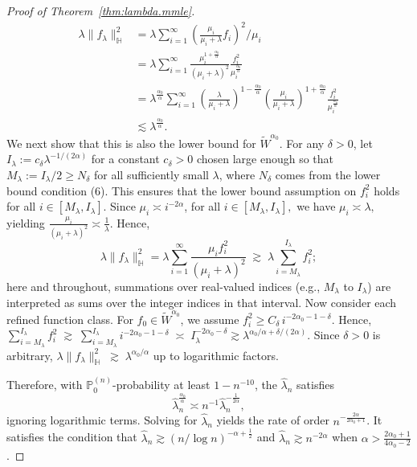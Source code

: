 \documentclass[12pt]{article}
\newcommand{\PP}{\mathbb{P}}
\newcommand{\bbH}{\mathbb{H}}
\theoremstyle{plain}
\theoremstyle{nonitalicremark}
\begin{document}
\begin{appendices}
\begin{proof}[Proof of Theorem~\ref{thm:lambda.mmle}]
\begin{align}
\lambda\|f_\lambda\|_\bbH^2&=\lambda\sum_{i=1}^{\infty} \left(\frac{\mu_i}{\mu_i+\lambda} f_i\right)^2 \bigg /\mu_i\\
&=\lambda\sum_{i=1}^{\infty} \frac{\mu_i^{1+\frac{\alpha_0}{\alpha}}}{(\mu_i+\lambda)^2}\frac{f_i^2}{\mu_i^{\frac{\alpha_0}{\alpha}}}\\
&=\lambda^{\frac{\alpha_0}{\alpha}}\sum_{i=1}^{\infty} \left(\frac{\lambda}{\mu_i+\lambda}\right)^{1-\frac{\alpha_0}{\alpha}}\left(\frac{\mu_i}{\mu_i+\lambda}\right)^{1+\frac{\alpha_0}{\alpha}}\frac{f_i^2}{\mu_i^{\frac{\alpha_0}{\alpha}}}\\
&\lesssim \lambda^{\frac{\alpha_0}{\alpha}}.
\end{align}
We next show that this is also the lower bound for $\widetilde{W}^{\alpha_0}$. For any $\delta > 0$, let $I_\lambda := c_\delta \lambda^{-1/(2\alpha)}$ for a constant $c_\delta > 0$ chosen large enough so that $M_\lambda := I_\lambda / 2 \ge N_\delta$ for all sufficiently small $\lambda$, where $N_{\delta}$ comes from the lower bound condition (6). This ensures that the lower bound assumption on $f_i^2$ holds for all $i \in [M_\lambda, I_\lambda]$.
Since $\mu_i \asymp i^{-2\alpha}$, for all $i \in [M_{\lambda}, I_{\lambda}],$  we have $\mu_i \asymp \lambda,$ yielding $  \frac{\mu_i}{(\mu_i + \lambda)^2}  \asymp \frac{1}{\lambda}.$
Hence,
\[
\lambda\|f_\lambda\|_\bbH^2 = \lambda \sum_{i=1}^\infty \frac{\mu_i f_i^2}{(\mu_i + \lambda)^2} 
\;\gtrsim\;
\lambda \sum_{i = M_\lambda}^{I_\lambda} f_i^2;
\]
here and throughout, summations over real-valued indices (e.g., $M_\lambda$ to $I_\lambda$) are interpreted as sums over the integer indices in that interval. Now consider each refined function class. For $f_0 \in \widetilde{W}^{\alpha_0}$, we assume $f_i^2 \ge C_\delta \, i^{-2\alpha_0 - 1 - \delta}$. Hence,
$\sum_{i = M_\lambda}^{I_\lambda}
f_i^2
\;\gtrsim\;
\sum_{i = M_\lambda}^{I_\lambda}
i^{-2\alpha_0-1-\delta}
\;\asymp\;
I_\lambda^{-2\alpha_0-\delta} \gtrsim 
\lambda^{\alpha_0/\alpha + \delta/(2\alpha)}.$ Since $\delta>0$ is arbitrary, $\lambda \| f_\lambda \|_{\mathbb H}^2
\;\gtrsim\;
\lambda^{\alpha_0/\alpha}$ up to logarithmic factors.  

Therefore, with $\PP_0^{(n)}$-probability at least $1-n^{-10}$, the $\hat\lambda_n$ satisfies
\begin{equation}
\hat\lambda_n^{\frac{\alpha_0}{\alpha}} \asymp n^{-1} \hat\lambda_n^{-\frac{1}{2\alpha}},
\end{equation}
ignoring logarithmic terms. Solving for $\hat\lambda_n$ yields the rate of order $n^{-\frac{2\alpha}{2\alpha_0+1}}$. It satisfies the condition that $\hat\lambda_n \gtrsim (n/\log n)^{-\alpha + \frac{1}{2}}$ and $\hat\lambda_n \gtrsim n^{-2\alpha}$ when $\alpha > \frac{2\alpha_0+1}{4\alpha_0-2}$.


\end{proof}
\end{appendices}
\end{document}
